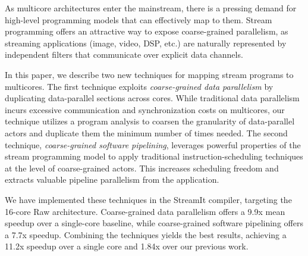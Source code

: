 As multicore architectures enter the mainstream, there is a pressing
demand for high-level programming models that can effectively map to
them.  Stream programming offers an attractive way to expose
coarse-grained parallelism, as streaming applications (image, video,
DSP, etc.) are naturally represented by independent filters that
communicate over explicit data channels.

In this paper, we describe two new techniques for mapping stream
programs to multicores.  The first technique exploits {\it
coarse-grained data parallelism} by duplicating data-parallel sections
across cores.  While traditional data parallelism incurs excessive
communication and synchronization costs on multicores, our technique
utilizes a program analysis to coarsen the granularity of
data-parallel actors and duplicate them the minimum number of times
needed.  The second technique, {\it coarse-grained software
pipelining}, leverages powerful properties of the stream programming
model to apply traditional instruction-scheduling techniques at the
level of coarse-grained actors.  This increases scheduling freedom and
extracts valuable pipeline parallelism from the application.

We have implemented these techniques in the StreamIt compiler,
targeting the 16-core Raw architecture.  Coarse-grained data
parallelism offers a 9.9x mean speedup over a single-core baseline,
while coarse-grained software pipelining offers a 7.7x speedup.
Combining the techniques yields the best results, achieving a 11.2x
speedup over a single core and 1.84x over our previous work.
